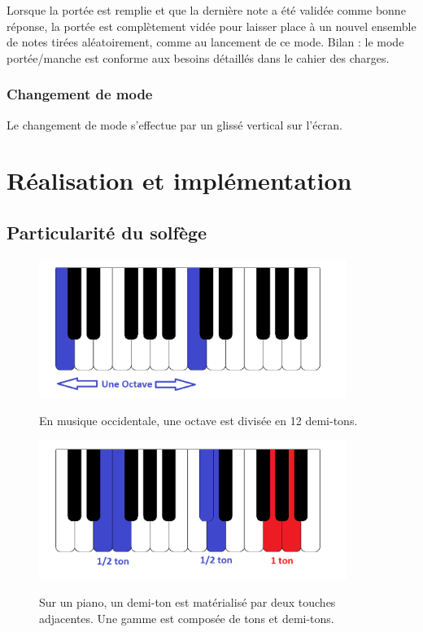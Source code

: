 \documentclass{scrreprt}
\begin{document}
Lorsque la portée est remplie et que la dernière note a été validée comme bonne réponse, la portée est complètement vidée pour laisser place à un nouvel ensemble de notes tirées aléatoirement, comme au lancement de ce mode.
\medbreak
Bilan : le mode portée/manche est conforme aux besoins détaillés dans le cahier des charges.

\subsection{Changement de mode}

Le changement de mode s'effectue par un glissé vertical sur l'écran. 

\chapter{Réalisation et implémentation}
\section{Particularité du solfège}
\label{portee}
\begin{figure}[!ht]
  \begin{minipage}{11cm}
      \includegraphics[width=10cm]{images/implementation/clavier-piano-octave.png}
  \end{minipage}\hfill
  \begin{minipage}{7cm}
  {En musique occidentale, une octave est divisée en 12 demi-tons. }
   \end{minipage}
\end{figure}

\begin{figure}[!ht]
  \begin{minipage}{11cm}
      \includegraphics[width=10cm]{images/implementation/clavier-piano-demi-ton-ton.png}
  \end{minipage}\hfill
  \begin{minipage}{7cm}
  {Sur un piano, un demi-ton est matérialisé par deux touches adjacentes. Une gamme est composée de tons et demi-tons.}
   \end{minipage}
\end{figure}
\end{document}
